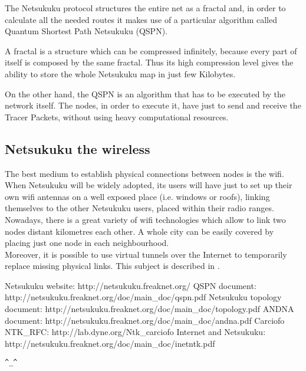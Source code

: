 \documentclass[a4paper]{article}
\newcommand{\href}[2]{ #1 }
\begin{document}
The Netsukuku protocol structures the entire net as a
fractal\cite{ntktopology} and, in order to calculate all the needed routes it
makes use of a particular algorithm called Quantum Shortest Path Netsukuku
(QSPN)\cite{qspndoc}.

A fractal is a structure which can be compressed infinitely, because every
part of itself is composed by the same fractal. Thus its high compression
level gives the ability to store the whole Netsukuku map in just few
Kilobytes.

On the other hand, the QSPN is an algorithm that has to be executed by the
network itself. The nodes, in order to execute it, have just to send and
receive the Tracer Packets, without using heavy computational resources.

\subsection{Netsukuku the wireless}
The best medium to establish physical connections between nodes is the wifi.
When Netsukuku will be widely adopted, its users will have just to set up their 
own wifi antennas on a well exposed place (i.e. windows or roofs), linking 
themselves to the other Netsukuku users, placed within their radio ranges.
Nowadays, there is a great variety of wifi technologies which allow to link
two nodes distant kilometres each other. A whole city can be easily covered by
placing just one node in each neighbourhood.\\
Moreover, it is possible to use virtual tunnels over the Internet to temporarily
replace missing physical links. This subject is described in \cite{inetdoc}.




\begin{thebibliography}{99}
	 Netsukuku website:
		\href{http://netsukuku.freaknet.org/}{http://netsukuku.freaknet.org/}
	 QSPN document:
		\href{http://netsukuku.freaknet.org/doc/main\_doc/qspn.pdf}{qspn.pdf}
	 Netsukuku topology document:
		\href{http://netsukuku.freaknet.org/doc/main\_doc/topology.pdf}{topology.pdf}
	 ANDNA document:
		\href{http://netsukuku.freaknet.org/doc/main\_doc/andna.pdf}{andna.pdf}
	 Carciofo NTK\_RFC:
		\href{http://lab.dyne.org/Ntk\_carciofo}{Carciofo}
	  Internet and Netsukuku:
		\href{http://netsukuku.freaknet.org/doc/main\_doc/inetntk.pdf}{inetntk.pdf}
	

\end{thebibliography}
\newpage

\begin{center}
\verb|^_^|
\end{center}
\end{document}
